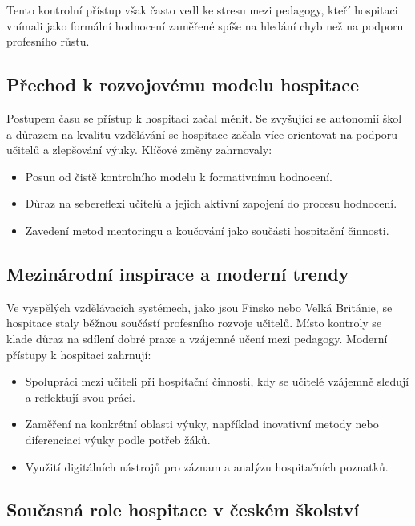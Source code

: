 Tento kontrolní přístup však často vedl ke stresu mezi pedagogy, kteří hospitaci vnímali jako formální hodnocení zaměřené spíše na hledání chyb než na podporu profesního růstu.

\subsection{Přechod k rozvojovému modelu hospitace}

Postupem času se přístup k hospitaci začal měnit. Se zvyšující se autonomií škol a důrazem na kvalitu vzdělávání se hospitace začala více orientovat na podporu učitelů a zlepšování výuky. Klíčové změny zahrnovaly:

\begin{itemize}
    \item Posun od čistě kontrolního modelu k formativnímu hodnocení.

    \item Důraz na sebereflexi učitelů a jejich aktivní zapojení do procesu hodnocení.

    \item Zavedení metod mentoringu a koučování jako součásti hospitační činnosti.
\end{itemize}

\subsection{Mezinárodní inspirace a moderní trendy}

Ve vyspělých vzdělávacích systémech, jako jsou Finsko nebo Velká Británie, se hospitace staly běžnou součástí profesního rozvoje učitelů. Místo kontroly se klade důraz na sdílení dobré praxe a vzájemné učení mezi pedagogy. Moderní přístupy k hospitaci zahrnují:

\begin{itemize}
    \item Spolupráci mezi učiteli při hospitační činnosti, kdy se učitelé vzájemně sledují a reflektují svou práci.

    \item Zaměření na konkrétní oblasti výuky, například inovativní metody nebo diferenciaci výuky podle potřeb žáků.

    \item Využití digitálních nástrojů pro záznam a analýzu hospitačních poznatků.
\end{itemize}

\subsection{Současná role hospitace v českém školství}

